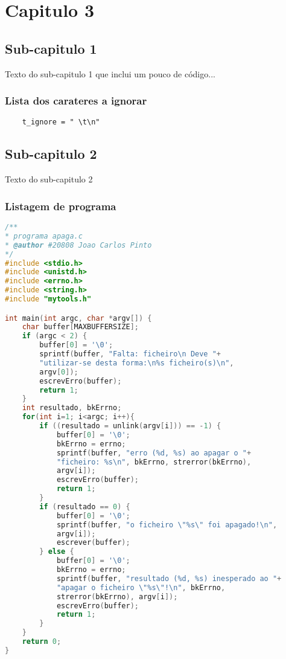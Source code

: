 
\chapter{Capitulo 3}

\section{Sub-capitulo 1}
Texto do sub-capitulo 1 que inclui um pouco de código...

\subsection{Lista dos carateres a ignorar}
\begin{Verbatim}
	t_ignore = " \t\n"
\end{Verbatim}
\hfill \break

\section{Sub-capitulo 2}
Texto do sub-capitulo 2

\subsection{Listagem de programa}
\begin{lstlisting}[language={c},
caption={Código do programa: \textbf{apaga}.},
label=lst:p1e]
/**
* programa apaga.c
* @author #20808 Joao Carlos Pinto
*/
#include <stdio.h>
#include <unistd.h>
#include <errno.h>
#include <string.h>
#include "mytools.h"

int main(int argc, char *argv[]) {
	char buffer[MAXBUFFERSIZE];
	if (argc < 2) {
		buffer[0] = '\0';
		sprintf(buffer, "Falta: ficheiro\n Deve "+
		"utilizar-se desta forma:\n%s ficheiro(s)\n", 
		argv[0]);
		escrevErro(buffer);
		return 1;
	}
	int resultado, bkErrno;
	for(int i=1; i<argc; i++){
		if ((resultado = unlink(argv[i])) == -1) {
			buffer[0] = '\0';
			bkErrno = errno;
			sprintf(buffer, "erro (%d, %s) ao apagar o "+
			"ficheiro: %s\n", bkErrno, strerror(bkErrno), 
			argv[i]);
			escrevErro(buffer);
			return 1;
		}
		if (resultado == 0) {
			buffer[0] = '\0';
			sprintf(buffer, "o ficheiro \"%s\" foi apagado!\n", 
			argv[i]);
			escrever(buffer);
		} else {
			buffer[0] = '\0';
			bkErrno = errno;
			sprintf(buffer, "resultado (%d, %s) inesperado ao "+
			"apagar o ficheiro \"%s\"!\n", bkErrno, 
			strerror(bkErrno), argv[i]);
			escrevErro(buffer);
			return 1;
		}
	}
	return 0;
}
\end{lstlisting}

